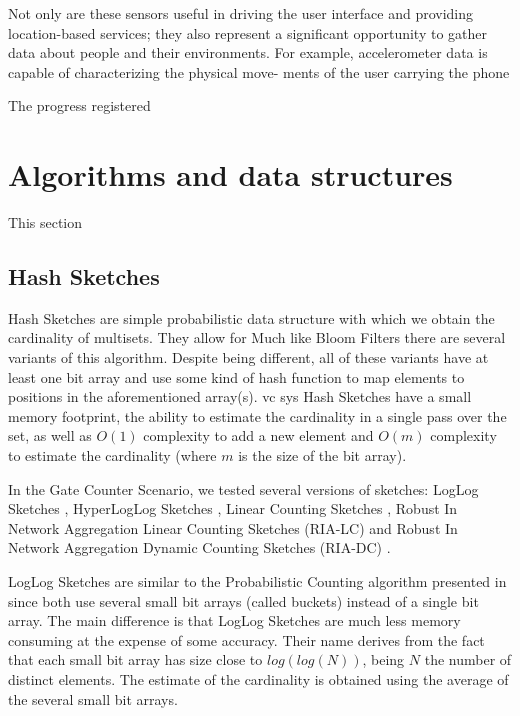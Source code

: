 Not only are these sensors useful in driving the user interface and
providing location-based services; they also represent a significant
opportunity to gather data about people and their environments. For
example, accelerometer data is capable of characterizing the physical
move- ments of the user carrying the phone

 The progress registered


\section{Algorithms and data structures}
\label{sec:algorithms_and_data_structures}
This section 
\subsection{Hash Sketches}
\label{sec:hash_sketches}

Hash Sketches are simple probabilistic data structure with which we 
obtain the cardinality of multisets. They allow for 
Much like Bloom Filters there are several variants of this algorithm.
Despite being different, all of these variants have at least one bit array
and use some kind of hash function to map elements to positions in the
aforementioned array(s).
vc sys
Hash Sketches have a small memory footprint, the ability to estimate the
cardinality in a single pass over the set, as well as $O(1)$ complexity to
add a new element and $O(m)$ complexity to estimate the cardinality (where
$m$ is the size of the bit array).

In the Gate Counter Scenario, we tested several versions of sketches: LogLog
Sketches \cite{Durand:2003tc}, HyperLogLog Sketches \cite{Fusy:2007um}, Linear
Counting Sketches \cite{Whang:1990uh}, Robust In Network Aggregation Linear
Counting Sketches (RIA-LC) \cite{Fan:2008wl,YaoChungFanArbeeLPChen:2010to} and
Robust In Network Aggregation Dynamic Counting Sketches (RIA-DC)
\cite{YaoChungFanArbeeLPChen:2010to}.

LogLog Sketches are similar to the Probabilistic Counting algorithm
presented in \cite{Flajolet:1985wd} since both use several small bit arrays
(called buckets) instead of a single bit array. The main difference is that
LogLog Sketches are much less memory consuming at the expense of some
accuracy. Their name derives from the fact that each small bit array has
size close to $log(log(N))$, being $N$ the number of distinct elements. The
estimate of the cardinality is obtained using the average of the several
small bit arrays.

